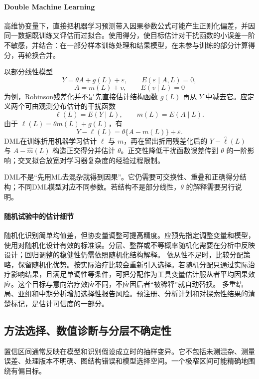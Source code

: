 \paragraph{Double Machine Learning}

高维协变量下，直接把机器学习预测带入因果参数公式可能产生正则化偏差，并因同一数据既训练又评估而过拟合。使用得分，使目标估计对干扰函数的小误差一阶不敏感，并结合：在一部分样本训练处理和结果模型，在未参与训练的部分计算得分，再轮换合并\parencite{chernozhukov2018}。

以部分线性模型
\[
Y=\theta A+g(L)+\varepsilon,\qquad E(\varepsilon\mid A,L)=0,
\]
\[
A=m(L)+v,\qquad E(v\mid L)=0
\]
为例，Robinson残差化并不是先直接估计结构函数 $g(L)$ 再从 $Y$ 中减去它。应定义两个可由观测分布估计的干扰函数
\[
\ell(L)=E(Y\mid L),\qquad m(L)=E(A\mid L).
\]
由于 $\ell(L)=\theta m(L)+g(L)$，有
\[
Y-\ell(L)=\theta\{A-m(L)\}+\varepsilon.
\]
DML在训练折用机器学习估计 $\ell$ 与 $m$，再在留出折用残差化后的 $Y-\widehat\ell(L)$ 与 $A-\widehat m(L)$ 构造正交得分并估计 $\theta$。正交性降低干扰函数误差传到 $\theta$ 的一阶影响；交叉拟合放宽对学习器复杂度的经验过程限制。

DML不是“先用ML去混杂就得到因果”。它仍需要可交换性、重叠和正确得分结构；不同DML模型对应不同参数。若结构不是部分线性，$\theta$ 的解释需要另行说明。

\paragraph{随机试验中的估计细节}

随机化识别简单均值差，但协变量调整可提高精度。应预先指定调整变量和模型，使用对随机化设计有效的标准误。分层、整群或不等概率随机化需要在分析中反映设计；回归调整的稳健性仍需依照随机化结构解释\parencite{lin2013}。
依从性不足时，比较分配策略，保留随机化优势。按实际治疗比较会重新引入选择。若随机分配只通过实际治疗影响结果，且满足单调性等条件，可把分配作为工具变量估计服从者平均因果效应。这个目标与意向治疗效应不同，不应因后者“被稀释”就自动替换。
多重结局、亚组和中期分析增加选择性报告风险。预注册、分析计划和对探索性结果的清楚标记，是估计可信度的一部分。

\subsection{方法选择、数值诊断与分层不确定性}

置信区间通常反映在模型和识别假设成立时的抽样变异。它不包括未测混杂、测量误差、处理版本不明确、图结构错误和模型选择空间。一个极窄区间可能精确地围绕有偏目标。

